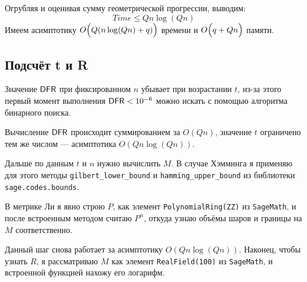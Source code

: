 Огрубляя и оценивая сумму геометрической прогрессии, выводим:
\begin{equation}
	Time \leq Qn\log(Qn)
\end{equation}
Имеем асимптотику $O\Bigl(Q(n\log(Qn)+q)\Bigr)$ времени и $O\Bigl(q+Qn\Bigr)$ памяти.

\subsection{Подсчёт t и R}

\begin{state}\label{st:search}
	Значение $\mathsf{DFR}$ при фиксированном $n$ убывает при возрастании $t$, из-за этого первый момент выполнения $\mathsf{DFR} < 10^{-6}$ можно искать с помощью алгоритма бинарного поиска.
\end{state}

Вычисление $\mathsf{DFR}$ происходит суммированием за $O(Qn)$, значение $t$ ограничено тем же числом --- асимптотика $O(Qn\log(Qn))$.

Дальше по данным $t$ и $n$ нужно вычислить $M$. В случае Хэмминга я применяю для этого методы \texttt{gilbert\_lower\_bound} и \texttt{hamming\_upper\_bound} из библиотеки \texttt{sage.codes.bounds}.

В метрике Ли я явно строю $P$, как элемент \texttt{PolynomialRing(ZZ)} из \texttt{SageMath}, и после встроенным методом считаю $P^n$, откуда узнаю объёмы шаров и границы на $M$ соответственно.

Данный шаг снова работает за асимптотику $O(Qn\log(Qn))$. Наконец, чтобы узнать $R$, я рассматриваю $M$ как элемент \texttt{RealField(100)} из \texttt{SageMath}, и встроенной функцией нахожу его логарифм.
